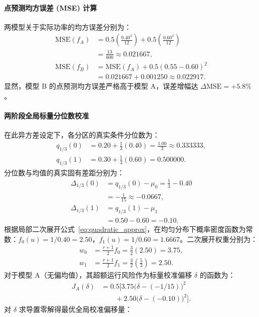 \paragraph{点预测均方误差 (MSE) 计算}
两模型关于实际功率的均方误差分别为：
\begin{align}
\text{MSE}(f_A) &= 0.5 \left(\frac{0.40^2}{12}\right) + 0.5 \left(\frac{0.60^2}{12}\right) \nonumber \\
&= \frac{13}{600} \approx 0.021667, \\
\text{MSE}(f_B) &= \text{MSE}(f_A) + 0.5 (0.55 - 0.60)^2 \nonumber \\
&= 0.021667 + 0.001250 \approx 0.022917.
\end{align}
显然，模型 B 的点预测均方误差严格高于模型 A，误差增幅达 $\Delta \text{MSE} = +5.8\%$。

\paragraph{两阶段全局标量分位数校准}
在此异方差设定下，各分区的真实条件分位数为：
\begin{align}
q_{1/3}(0) &= 0.20 + \frac{1}{3}(0.40) = \frac{1.00}{3} \approx 0.333333, \\
q_{1/3}(1) &= 0.30 + \frac{1}{3}(0.60) = 0.500000.
\end{align}
分位数与均值的真实固有差距分别为：
\begin{align}
\Delta_{1/3}(0) &= q_{1/3}(0) - \mu_0 = \frac{1}{3} - 0.40 \nonumber \\
&= -\frac{1}{15} \approx -0.0667, \\
\Delta_{1/3}(1) &= q_{1/3}(1) - \mu_1 \nonumber \\
&= 0.50 - 0.60 = -0.10.
\end{align}
根据局部二次展开公式~\eqref{eq:quadratic_approx}，在均匀分布下概率密度函数为常数：$f_0(u) = 1/0.40 = 2.50$，$f_1(u) = 1/0.60 = 1.6667$。二次展开权重分别为：
\begin{align}
w_0 &= \frac{r+1}{2} f_0 = \frac{3}{2}(2.50) = 3.75, \\
w_1 &= \frac{r+1}{2} f_1 = \frac{3}{2}\left(\frac{5}{3}\right) = 2.50.
\end{align}
对于模型 A（无偏均值），其超额运行风险作为标量校准偏移 $\delta$ 的函数为：
\begin{align}
J_A(\delta) &= 0.5 \Big[ 3.75 \big(\delta - (-1/15)\big)^2 \nonumber \\
&\qquad + 2.50 \big(\delta - (-0.10)\big)^2 \Big].
\end{align}
对 $\delta$ 求导置零解得最优全局校准偏移量：
